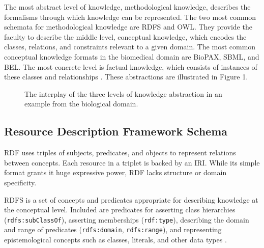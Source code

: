 The most abstract level of knowledge, methodological knowledge, describes the formalisms through which knowledge can be represented. The two most common schemata for methodological knowledge are \ac{RDFS} and \ac{OWL}. They provide the faculty to describe the middle level, conceptual knowledge, which encodes the classes, relations, and constraints relevant to a given domain.  The most common conceptual knowledge formats in the biomedical domain are \ac{BioPAX}, \ac{SBML}, and \ac{BEL}. The most concrete level is factual knowledge, which consists of instances of these classes and relationships \cite{Marchetti2008}. These abstractions are illustrated in Figure 1.

\begin{figure}
\captionsetup{format=plain}
\caption[Levels of Knowledge Abstraction]{The interplay of the three levels of knowledge abstraction in an example from the biological domain.}
\label{Fig:knowledge_types}
\end{figure}
	
\subsection{Resource Description Framework Schema}
    
\ac{RDF} uses triples of subjects, predicates, and objects to represent relations between concepts. Each resource in a triplet is backed by an \ac{IRI}. While its simple format grants it huge expressive power, RDF lacks structure or domain specificity. 

\ac{RDFS} is a set of concepts and predicates appropriate for describing knowledge at the conceptual level. Included are predicates for asserting class hierarchies (\verb|rdfs:subClassOf|), asserting memberships (\verb|rdf:type|), describing the domain and range of predicates (\verb|rdfs:domain|, \verb|rdfs:range|), and representing epistemological concepts such as classes, literals, and other data types \cite{Beckett2014}.

